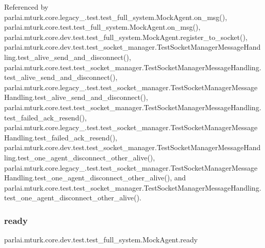 Referenced by parlai.\+mturk.\+core.\+legacy\+\_.\+test.\+test\+\_\+full\+\_\+system.\+Mock\+Agent.\+on\+\_\+msg(), parlai.\+mturk.\+core.\+test.\+test\+\_\+full\+\_\+system.\+Mock\+Agent.\+on\+\_\+msg(), parlai.\+mturk.\+core.\+dev.\+test.\+test\+\_\+full\+\_\+system.\+Mock\+Agent.\+register\+\_\+to\+\_\+socket(), parlai.\+mturk.\+core.\+dev.\+test.\+test\+\_\+socket\+\_\+manager.\+Test\+Socket\+Manager\+Message\+Handling.\+test\+\_\+alive\+\_\+send\+\_\+and\+\_\+disconnect(), parlai.\+mturk.\+core.\+test.\+test\+\_\+socket\+\_\+manager.\+Test\+Socket\+Manager\+Message\+Handling.\+test\+\_\+alive\+\_\+send\+\_\+and\+\_\+disconnect(), parlai.\+mturk.\+core.\+legacy\+\_.\+test.\+test\+\_\+socket\+\_\+manager.\+Test\+Socket\+Manager\+Message\+Handling.\+test\+\_\+alive\+\_\+send\+\_\+and\+\_\+disconnect(), parlai.\+mturk.\+core.\+test.\+test\+\_\+socket\+\_\+manager.\+Test\+Socket\+Manager\+Message\+Handling.\+test\+\_\+failed\+\_\+ack\+\_\+resend(), parlai.\+mturk.\+core.\+legacy\+\_.\+test.\+test\+\_\+socket\+\_\+manager.\+Test\+Socket\+Manager\+Message\+Handling.\+test\+\_\+failed\+\_\+ack\+\_\+resend(), parlai.\+mturk.\+core.\+dev.\+test.\+test\+\_\+socket\+\_\+manager.\+Test\+Socket\+Manager\+Message\+Handling.\+test\+\_\+one\+\_\+agent\+\_\+disconnect\+\_\+other\+\_\+alive(), parlai.\+mturk.\+core.\+legacy\+\_.\+test.\+test\+\_\+socket\+\_\+manager.\+Test\+Socket\+Manager\+Message\+Handling.\+test\+\_\+one\+\_\+agent\+\_\+disconnect\+\_\+other\+\_\+alive(), and parlai.\+mturk.\+core.\+test.\+test\+\_\+socket\+\_\+manager.\+Test\+Socket\+Manager\+Message\+Handling.\+test\+\_\+one\+\_\+agent\+\_\+disconnect\+\_\+other\+\_\+alive().

\mbox{\label{classparlai_1_1mturk_1_1core_1_1dev_1_1test_1_1test__full__system_1_1MockAgent_acde1350e560777f2bfe188b01164b7ee}} 
\subsubsection{\texorpdfstring{ready}{ready}}
{\footnotesize\ttfamily parlai.\+mturk.\+core.\+dev.\+test.\+test\+\_\+full\+\_\+system.\+Mock\+Agent.\+ready}



